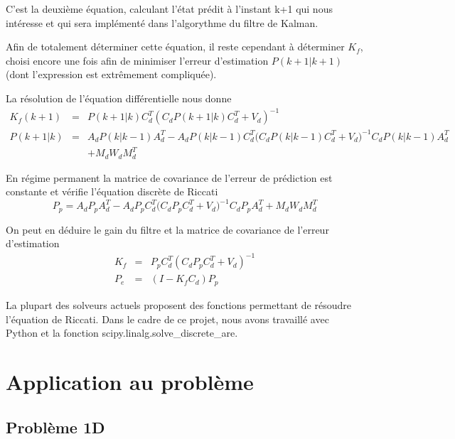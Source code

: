 \documentclass[12pt,twoside,a4paper]{article}
\begin{document}
\noindent C'est la deuxième équation, calculant l'état prédit à l'instant k+1 qui nous intéresse et qui sera implémenté dans l'algorythme du filtre de Kalman. \\

\vspace{1cm} 

Afin de totalement déterminer cette équation, il reste cependant à déterminer $K_{f}$, choisi encore une fois afin de minimiser l'erreur d'estimation $P(k+1|k+1)$ (dont l'expression est extrêmement compliquée).

La résolution de l'équation différentielle nous donne 
$$
\begin{array}{lll}
K_{f}(k+1) &=& P(k+1|k)C_{d}^{T}(C_{d}P(k+1|k)C_{d}^{T}+V_{d})^{-1} \\
P(k+1|k) &=&  A_{d}P(k|k-1)A_{d}^{T} -A_{d}P(k|k-1)C_{d}^{T}\big(C_{d}P(k|k-1)C_{d}^{T}+V_{d}\big)^{-1}C_{d}P(k|k-1)A_{d}^{T} \\
&& + M_{d}W_{d}M_{d}^{T}
\end{array}
$$

En régime permanent la matrice de covariance de l'erreur de prédiction est constante et vérifie l'équation discrète de Riccati
$$ P_{p} =  A_{d}P_{p}A_{d}^{T} -A_{d}P_{p}C_{d}^{T}\big(C_{d}P_{p}C_{d}^{T}+V_{d}\big)^{-1}C_{d}P_{p}A_{d}^{T}  + M_{d}W_{d}M_{d}^{T} $$

\vspace{1cm} 
On peut en déduire le gain du filtre et la matrice de covariance de l'erreur d'estimation 
$$ 
\begin{array}{lll}
K_{f} &=& P_{p}C_{d}^{T}(C_{d}P_{p}C_{d}^{T}+V_{d})^{-1} \\
P_{e} &=& (I-K_{f}C_{d})P_{p}
\end{array}$$



La plupart des solveurs actuels proposent des fonctions permettant de résoudre l'équation de Riccati. 
Dans le cadre de ce projet, nous avons travaillé avec Python et la fonction scipy.linalg.solve\_discrete\_are. \\

\section{Application au problème}

\subsection{Problème 1D}
\end{document}
